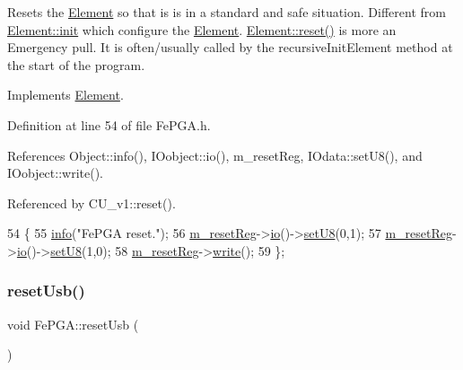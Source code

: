 Resets the \hyperlink{classElement}{Element} so that is is in a standard and safe situation. Different from \hyperlink{classElement_af42754b5cabc198869222725218d695c}{Element\+::init} which configure the \hyperlink{classElement}{Element}. \hyperlink{classElement_a69efffa22f06909d768149715565cb56}{Element\+::reset()} is more an Emergency pull. It is often/usually called by the recursive\+Init\+Element method at the start of the program. 

Implements \hyperlink{classElement_a69efffa22f06909d768149715565cb56}{Element}.



Definition at line 54 of file Fe\+P\+G\+A.\+h.



References Object\+::info(), I\+Oobject\+::io(), m\+\_\+reset\+Reg, I\+Odata\+::set\+U8(), and I\+Oobject\+::write().



Referenced by C\+U\+\_\+v1\+::reset().


\begin{DoxyCode}
54                \{
55     \hyperlink{classObject_a644fd329ea4cb85f54fa6846484b84a8}{info}(\textcolor{stringliteral}{"FePGA reset."});
56     \hyperlink{classFePGA_aeff1a2370237a06b50e1ae23d933c862}{m\_resetReg}->\hyperlink{classIOobject_af04fb94137c3d86849f478ac5afab5d1}{io}()->\hyperlink{classIOdata_a6c4fb2f2af01889ada889c2b7aceb24d}{setU8}(0,1);
57     \hyperlink{classFePGA_aeff1a2370237a06b50e1ae23d933c862}{m\_resetReg}->\hyperlink{classIOobject_af04fb94137c3d86849f478ac5afab5d1}{io}()->\hyperlink{classIOdata_a6c4fb2f2af01889ada889c2b7aceb24d}{setU8}(1,0);
58     \hyperlink{classFePGA_aeff1a2370237a06b50e1ae23d933c862}{m\_resetReg}->\hyperlink{classIOobject_a9f6984bc9f0fadcf800f1be2523ac744}{write}();
59   \};
\end{DoxyCode}
\mbox{\label{classFePGA_a79d95b2fccf4d2ea473e6cf6980d6cf6}} 
\subsubsection{\texorpdfstring{reset\+Usb()}{resetUsb()}}
{\footnotesize\ttfamily void Fe\+P\+G\+A\+::reset\+Usb (\begin{DoxyParamCaption}{ }\end{DoxyParamCaption})\hspace{0.3cm}{\ttfamily [inline]}}



